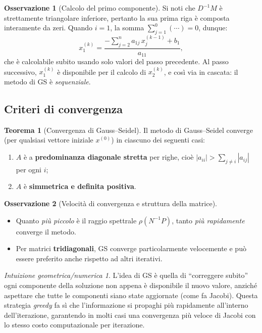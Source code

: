 \documentclass[a4paper,12pt]{article}
\theoremstyle{definition}
\newtheorem{teorema}{Teorema}[section]
\newtheorem{osservazione}{Osservazione}[section]
\theoremstyle{remark}
\newtheorem*{intuizione}{Intuizione geometrica/numerica}
\begin{document}
\begin{osservazione}[Calcolo del primo componente]
Si noti che $D^{-1}M$ è strettamente triangolare inferiore, pertanto la
sua prima riga è composta interamente da zeri.
Quando $i = 1$, la somma $\sum_{j=1}^{0}(\cdots) = 0$, dunque:
\[
  x_1^{(k)} = \frac{-\sum_{j=2}^{n} a_{1j}\,x_j^{(k-1)} + b_1}{a_{11}},
\]
che è calcolabile subito usando solo valori del passo precedente.
Al passo successivo, $x_1^{(k)}$ è disponibile per il calcolo di $x_2^{(k)}$,
e così via in cascata: il metodo di GS è \emph{sequenziale}.
\end{osservazione}

\subsection{Criteri di convergenza}

\begin{teorema}[Convergenza di Gauss--Seidel]
Il metodo di Gauss--Seidel converge (per qualsiasi vettore iniziale
$x^{(0)}$) in ciascuno dei seguenti casi:
\begin{enumerate}
  \item $A$ è a \textbf{predominanza diagonale stretta} per righe,
        cioè $|a_{ii}| > \sum_{j \neq i} |a_{ij}|$ per ogni $i$;
  \item $A$ è \textbf{simmetrica e definita positiva}.
\end{enumerate}
\end{teorema}

\begin{osservazione}[Velocità di convergenza e struttura della matrice]
\leavevmode
\begin{itemize}
  \item Quanto \emph{più piccolo} è il raggio spettrale $\rho(N^{-1}P)$,
        tanto \emph{più rapidamente} converge il metodo.
  \item Per matrici \textbf{tridiagonali}, GS converge particolarmente
        velocemente e può essere preferito anche rispetto ad altri iterativi.
\end{itemize}
\end{osservazione}

\begin{intuizione}
L'idea di GS è quella di ``correggere subito'' ogni componente della
soluzione non appena è disponibile il nuovo valore, anziché aspettare
che tutte le componenti siano state aggiornate (come fa Jacobi).
Questa strategia \emph{greedy} fa sì che l'informazione si propaghi
più rapidamente all'interno dell'iterazione, garantendo in molti casi
una convergenza più veloce di Jacobi con lo stesso costo computazionale
per iterazione.
\end{intuizione}
\end{document}
